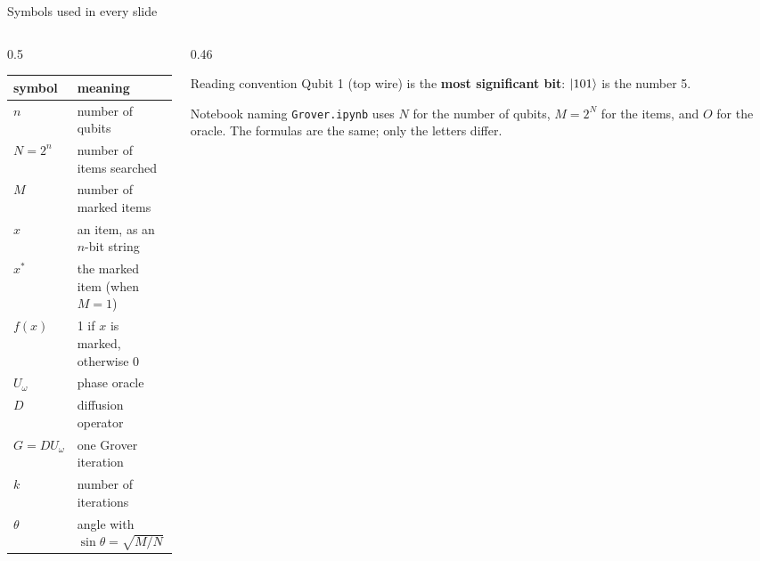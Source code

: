 \documentclass[aspectratio=169,11pt]{beamer}
\newcommand{\hl}[1]{{\color{qorange}\textbf{#1}}}
\newcommand{\xs}{x^\ast}
\newcommand{\Uo}{U_\omega}
\begin{document}
\begin{frame}{Symbols used in every slide}
  \begin{columns}[T]
    \begin{column}{0.5\textwidth}
      \small
      \begin{tabular}{ll}
        \toprule
        symbol & meaning\\
        \midrule
        $n$ & number of qubits\\
        $N = 2^n$ & number of items searched\\
        $M$ & number of marked items\\
        $x$ & an item, as an $n$-bit string\\
        $\xs$ & the marked item (when $M = 1$)\\
        $f(x)$ & 1 if $x$ is marked, otherwise 0\\
        $\Uo$ & phase oracle\\
        $D$ & diffusion operator\\
        $G = D\Uo$ & one Grover iteration\\
        $k$ & number of iterations\\
        $\theta$ & angle with $\sin\theta = \sqrt{M/N}$\\
        \bottomrule
      \end{tabular}
    \end{column}
    \begin{column}{0.46\textwidth}
      \begin{block}{Reading convention}
        Qubit 1 (top wire) is the \hl{most significant bit}: $\ket{101}$ is the number 5.
      \end{block}
      \vspace{1mm}
      \begin{alertblock}{Notebook naming}
        \texttt{Grover.ipynb} uses $N$ for the number of qubits, $M = 2^N$ for the items, and $O$ for the oracle. The formulas are the same; only the letters differ.
      \end{alertblock}
    \end{column}
  \end{columns}
\end{frame}

\end{document}

